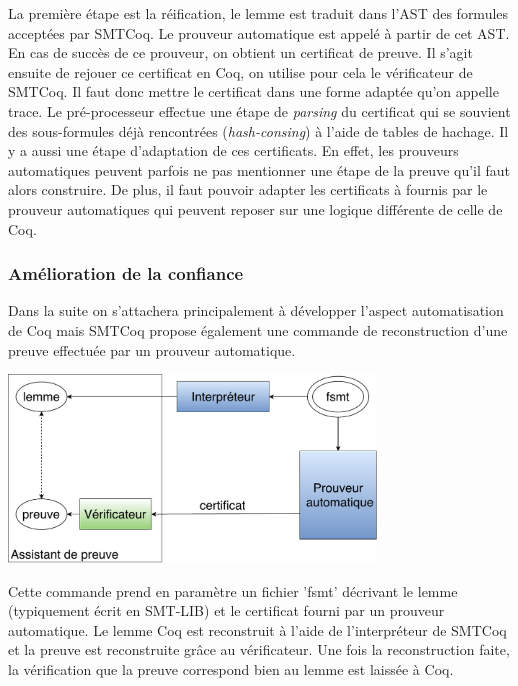 \documentclass[11pt]{article}
\begin{document}
La première étape est la réification, le lemme est traduit dans l'AST des formules acceptées par SMTCoq. Le prouveur automatique est appelé à partir de cet AST. En cas de succès de ce prouveur, on obtient un certificat de preuve. 
Il s'agit ensuite de rejouer ce certificat en Coq, on utilise pour cela le vérificateur de SMTCoq. Il faut donc mettre le certificat dans une forme adaptée qu'on appelle trace. Le pré-processeur effectue une étape de \textit{parsing} du certificat qui se souvient des sous-formules déjà rencontrées (\textit{hash-consing}) à l'aide de tables de hachage.  Il y a aussi une étape d'adaptation de ces certificats. En effet, les prouveurs automatiques peuvent parfois ne pas mentionner une étape de la preuve qu'il faut alors construire. De plus, il faut pouvoir adapter les certificats à fournis par le prouveur automatiques qui peuvent reposer sur une logique différente de celle de Coq. \\





\subsubsection{Amélioration de la confiance}

Dans la suite on s'attachera principalement à développer l'aspect automatisation de Coq mais SMTCoq propose également une commande de reconstruction d'une preuve effectuée par un prouveur automatique.

\begin{center}
\includegraphics[height=5cm]{Confiance.pdf}
\end{center}

Cette commande prend en paramètre un fichier 'fsmt' décrivant le lemme (typiquement écrit en SMT-LIB) et le certificat fourni par un prouveur automatique. Le lemme Coq est reconstruit à l'aide de l'interpréteur de SMTCoq et la preuve est reconstruite grâce au vérificateur. Une fois la reconstruction faite, la vérification que la preuve correspond bien au lemme est laissée à Coq. \\
\end{document}
